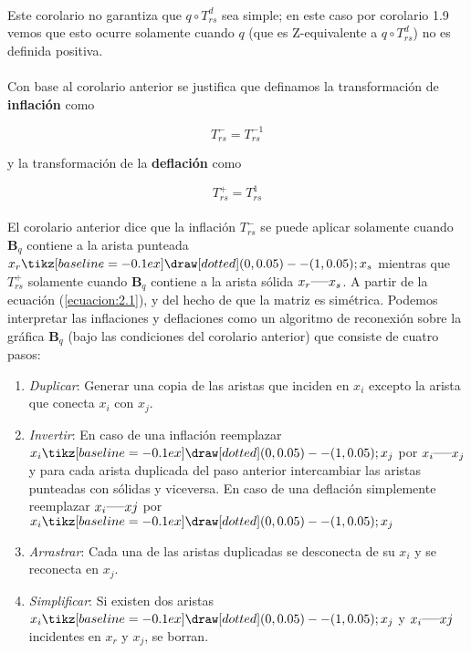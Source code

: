 \paragraph{}
Este corolario no garantiza que $q \circ T_{rs}^{d}$ sea simple; en este caso por corolario 1.9 vemos que esto ocurre solamente cuando $q$ (que es $\mathrm{Z}$-equivalente a $q \circ T_{rs}^{d}$) no es definida positiva.

\paragraph{}
Con base al corolario anterior se justifica que definamos la transformación de \textbf{inflación} como

\begin{equation*}
    T_{rs}^{-} = T_{rs}^{-1}
\end{equation*}

y la transformación de la \textbf{deflación} como

\begin{equation*}
    T_{rs}^{+} = T_{rs}^{1}
\end{equation*}

\paragraph{}
El corolario anterior dice que la inflación $T_{rs}^{-}$ se puede aplicar solamente cuando $\textbf{B}_{q}$ contiene a la arista punteada $x_{r} \tikz[baseline=-0.1ex]\draw [dotted] (0,0.05) -- (1,0.05); x_{s}$ mientras que $T_{rs}^{+}$ solamente cuando $\textbf{B}_{q}$ contiene a la arista sólida $x_{r}  \rule[1mm]{5mm}{0.1mm} x_{s}$. A partir de la ecuación (\ref{ecuacion:2.1}), y del hecho de que la matriz es simétrica. Podemos interpretar las inflaciones y deflaciones como un algoritmo de reconexión sobre la gráfica $\textbf{B}_{q}$ (bajo las condiciones del corolario anterior) que consiste de cuatro pasos:

\begin{enumerate}
    \item \textit{Duplicar}: Generar una copia de las aristas que inciden en $x_{i}$ excepto la arista que conecta $x_{i}$ con $x_{j}$.
    \item \textit{Invertir}: En caso de una inflación reemplazar $x_{i} \tikz[baseline=-0.1ex]\draw [dotted] (0,0.05) -- (1,0.05); x_{j}$ por $x_{i} \rule[1mm]{5mm}{0.1mm} x_{j}$ y para cada arista duplicada del paso anterior intercambiar las aristas punteadas con sólidas y viceversa. En caso de una deflación simplemente reemplazar $x_{i} \rule[1mm]{5mm}{0.1mm} x{j}$ por $x_{i} \tikz[baseline=-0.1ex]\draw [dotted] (0,0.05) -- (1,0.05); x_{j}$
    \item \textit{Arrastrar}: Cada una de las aristas duplicadas se desconecta de su $x_{i}$ y se reconecta en $x_{j}$.
    \item \textit{Simplificar}: Si existen dos aristas $x_{i} \tikz[baseline=-0.1ex]\draw [dotted] (0,0.05) -- (1,0.05); x_{j}$ y $x_{i} \rule[1mm]{5mm}{0.1mm} x{j}$ incidentes en $x_{r}$ y $x_{j}$,  se borran.
\end{enumerate}


